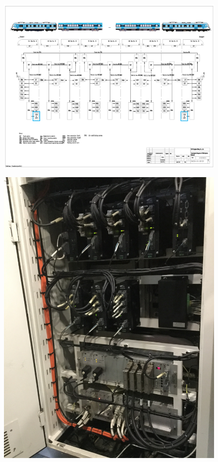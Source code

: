 \begin{figure}[ht]
	\centering
	\includegraphics[width=1\textwidth]{./Figures/diagramaTrenesArgentinosTCN.png}
	\caption{}
	\label{fig:sofseTCN}
\end{figure}


\begin{figure}[ht]
	\centering
	\includegraphics[width=1\textwidth , angle=90]{./Figures/imgRackTCN.JPG}
	\caption{}
	\label{fig:imgRackTCN}
\end{figure}




